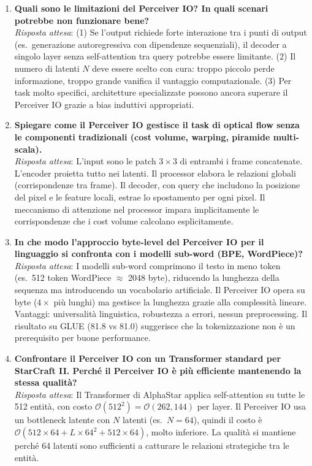 \documentclass[12pt,a4paper]{article}
\begin{document}
\begin{enumerate}[label=\textbf{Q\arabic*.}, resume]
    \item \textbf{Quali sono le limitazioni del Perceiver IO? In quali scenari potrebbe non funzionare bene?}\\
    \textit{Risposta attesa}: (1) Se l'output richiede forte interazione tra i punti di output (es.\ generazione autoregressiva con dipendenze sequenziali), il decoder a singolo layer senza self-attention tra query potrebbe essere limitante. (2) Il numero di latenti $N$ deve essere scelto con cura: troppo piccolo perde informazione, troppo grande vanifica il vantaggio computazionale. (3) Per task molto specifici, architetture specializzate possono ancora superare il Perceiver IO grazie a bias induttivi appropriati.

    \item \textbf{Spiegare come il Perceiver IO gestisce il task di optical flow senza le componenti tradizionali (cost volume, warping, piramide multi-scala).}\\
    \textit{Risposta attesa}: L'input sono le patch $3 \times 3$ di entrambi i frame concatenate. L'encoder proietta tutto nei latenti. Il processor elabora le relazioni globali (corrispondenze tra frame). Il decoder, con query che includono la posizione del pixel e le feature locali, estrae lo spostamento per ogni pixel. Il meccanismo di attenzione nel processor impara implicitamente le corrispondenze che i cost volume calcolano esplicitamente.

    \item \textbf{In che modo l'approccio byte-level del Perceiver IO per il linguaggio si confronta con i modelli sub-word (BPE, WordPiece)?}\\
    \textit{Risposta attesa}: I modelli sub-word comprimono il testo in meno token (es.\ 512 token WordPiece $\approx$ 2048 byte), riducendo la lunghezza della sequenza ma introducendo un vocabolario artificiale. Il Perceiver IO opera su byte ($4\times$ pi\`u lunghi) ma gestisce la lunghezza grazie alla complessit\`a lineare. Vantaggi: universalit\`a linguistica, robustezza a errori, nessun preprocessing. Il risultato su GLUE (81.8 vs 81.0) suggerisce che la tokenizzazione non \`e un prerequisito per buone performance.

    \item \textbf{Confrontare il Perceiver IO con un Transformer standard per StarCraft II. Perch\'e il Perceiver IO \`e pi\`u efficiente mantenendo la stessa qualit\`a?}\\
    \textit{Risposta attesa}: Il Transformer di AlphaStar applica self-attention su tutte le 512 entit\`a, con costo $\mathcal{O}(512^2) = \mathcal{O}(262{,}144)$ per layer. Il Perceiver IO usa un bottleneck latente con $N$ latenti (es.\ $N = 64$), quindi il costo \`e $\mathcal{O}(512 \times 64 + L \times 64^2 + 512 \times 64)$, molto inferiore. La qualit\`a si mantiene perch\'e 64 latenti sono sufficienti a catturare le relazioni strategiche tra le entit\`a.


\end{enumerate}
\end{document}
